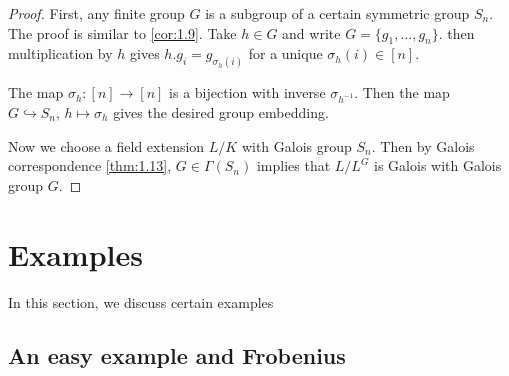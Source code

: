 \documentclass[twoside = false,	%
		headsepline,		%
		parskip = true,
		]{scrbook}						%
\begin{document}
        \begin{proof}
            First, any finite group $G$ is a subgroup of a certain symmetric group $S_n$. The proof is similar to \ref{cor:1.9}. Take $h \in G$ and write $G = \{g_1, \dots, g_n\}$. then multiplication by $h$ gives $h.g_i = g_{\sigma_h(i)}$ for a unique $\sigma_h(i) \in [n]$.
            
            The map $\sigma_h: [n] \rightarrow [n]$ is a bijection with inverse $\sigma_{h^{-1}}$. Then the map $G \hookrightarrow S_n, \, h \mapsto \sigma_h$ gives the desired group embedding.
            
            Now we choose a field extension $L/K$ with Galois group $S_n$. Then by Galois correspondence \ref{thm:1.13}, $G \in \Gamma(S_n)$ implies that $L/L^G$ is Galois with Galois group $G$. 
        \end{proof}

\section{Examples}
    In this section, we discuss certain examples
    \subsection{An easy example and Frobenius}
    
\end{document}
